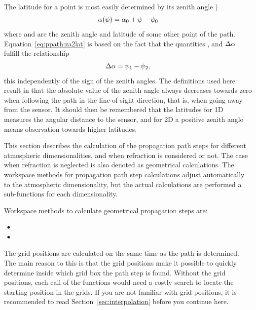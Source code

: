 The latitude for a point is most easily determined by its zenith angle
)
\begin{equation}
  \alpha(\psi) = \alpha_{0} + \psi - \psi_{0} 
  \label{eq:ppath:za2lat}
\end{equation}
where  and  are the zenith angle and latitude of some 
other point of the path. Equation~\ref{eq:ppath:za2lat} is based on the 
fact that the quantities ,  and $\Delta\alpha$
fulfill the relationship
\begin{equation}
  \Delta\alpha = \psi_{1} - \psi_{2},
\end{equation}
this independently of the sign of the zenith angles. The definitions
used here result in that the absolute value of the zenith angle always
decreases towards zero when following the path in the line-of-sight
direction, that is, when going away from the sensor. It should then be
remembered that the latitudes for 1D measures the angular distance to
the sensor, and for 2D a positive zenith angle means observation
towards higher latitudes.




\label{sec:ppath:stepcalc}

This section describes the calculation of the propagation path steps
for different atmospheric dimensionalities, and when refraction is
considered or not. The case when refraction is neglected is also
denoted as geometrical calculations. The workspace methods for
propagation path step calculations adjust automatically to the
atmospheric dimensionality, but the actual calculations are performed
a sub-functions for each dimensionality.

Workspace methods to calculate geometrical propagation steps are:
\begin{itemize}
\item {}
\item {}
\end{itemize}



The grid positions are calculated on the same time as the path is
determined. The main reason to this is that the grid positions make it
possible to quickly determine inside which grid box the path step is
found. Without the grid positions, each call of the functions would
need a costly search to locate the starting position in the grids.  If
you are not familiar with grid positions, it is recommended to read
Section~\ref{sec:interpolation} before you continue here.

